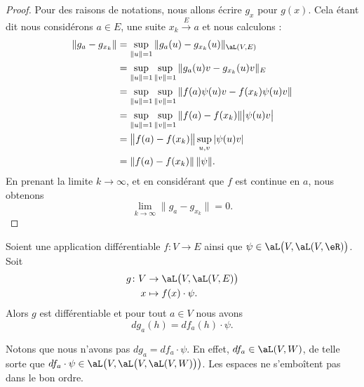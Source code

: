 \begin{proof}
	Pour des raisons de notations, nous allons écrire \( g_x\) pour \( g(x)\). Cela étant dit nous considérons \( a\in E\), une suite \( x_k\stackrel{E}{\longrightarrow}a \) et nous calculons :
	\begin{subequations}
		\begin{align}
			\| g_a-g_{x_k} \| & =\sup_{\| u \|=1}\| g_a(u)-g_{x_k}(u) \|_{\aL(V,E)}                    \\
			                  & =\sup_{\| u \|=1}\sup_{\| v \|=1}\| g_a(u)v-g_{x_k}(u)v \|_{E}         \\
			                  & =\sup_{\| u \|=1}\sup_{\| v \|=1}\| f(a)\psi(u)v-f(x_k)\psi(u)v \|     \\
			                  & =\sup_{\| u \|=1}\sup_{\| v \|=1}\| f(a)-f(x_k) \|\big| \psi(u)v \big| \\
			                  & =\big\| f(a)-f(x_k) \big\|\sup_{u,v}| \psi(u)v |                       \\
			                  & =\| f(a)-f(x_k) \|\,\| \psi \|.
		\end{align}
	\end{subequations}
	En prenant la limite \( k\to \infty\), et en considérant que \( f\) est continue en \( a\), nous obtenons
	\begin{equation}
		\lim_{k\to \infty} \| g_a-g_{x_k} \|=0.
	\end{equation}
\end{proof}

\begin{lemma}
	Soient une application différentiable \( f\colon V\to E\) ainsi que \( \psi\in\aL\big( V,\aL(V,\eR) \big)\). Soit
	\begin{equation}
		\begin{aligned}
			g\colon V & \to \aL\big(V, \aL(V,E) \big) \\
			x         & \mapsto f(x)\cdot \psi.
		\end{aligned}
	\end{equation}
	Alors \( g\) est différentiable et pour tout \( a\in V\) nous avons
	\begin{equation}
		dg_a(h)=df_a(h)\cdot \psi.
	\end{equation}
\end{lemma}

Notons que nous n'avons pas \( dg_a=df_a\cdot \psi\). En effet, \( df_a\in \aL( V,W )\), de telle sorte que \( df_a\cdot\psi\in \aL\big( V,\aL\big( V,\aL(V,W) \big) \big)\). Les espaces ne s'emboîtent pas dans le bon ordre.

